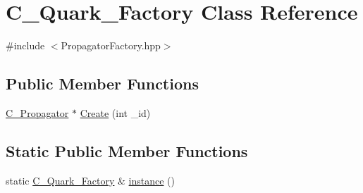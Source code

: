 \hypertarget{class_c___quark___factory}{\section{C\-\_\-\-Quark\-\_\-\-Factory Class Reference}
\label{class_c___quark___factory}
}


{\ttfamily \#include $<$Propagator\-Factory.\-hpp$>$}

\subsection*{Public Member Functions}
\begin{DoxyCompactItemize}
\item 
\hyperlink{class_c___propagator}{C\-\_\-\-Propagator} $\ast$ \hyperlink{class_c___quark___factory_a61cb5db5bb6a0307a36dfd9af4736316}{Create} (int \-\_\-id)
\end{DoxyCompactItemize}
\subsection*{Static Public Member Functions}
\begin{DoxyCompactItemize}
\item 
static \hyperlink{class_c___quark___factory}{C\-\_\-\-Quark\-\_\-\-Factory} \& \hyperlink{class_c___quark___factory_a939240ac9a4d43c463f771bcaf53fb66}{instance} ()
\end{DoxyCompactItemize}


